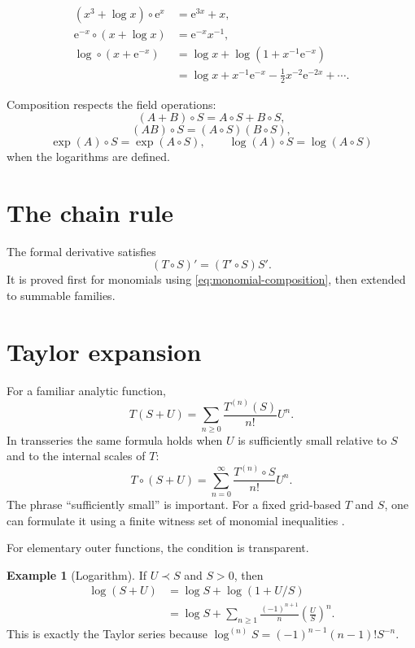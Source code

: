 \documentclass[11pt,oneside]{book}
\theoremstyle{definition}
\newtheorem{example}[theorem]{Example}
\theoremstyle{remark}
\newcommand{\e}{\mathrm{e}}
\newcommand{\precdom}{\prec}
\newcommand{\compose}{\mathbin{\circ}}
\begin{document}
\begin{align*}
  (x^3+\log x)\compose\e^x
  &=\e^{3x}+x,\\
  \e^{-x}\compose(x+\log x)
  &=\e^{-x}x^{-1},\\
  \log\compose(x+\e^{-x})
  &=\log x+\log(1+x^{-1}\e^{-x})\\
  &=\log x+x^{-1}\e^{-x}
    -\frac12x^{-2}\e^{-2x}+\cdots.
\end{align*}

Composition respects the field operations:
\[
  (A+B)\compose S=A\compose S+B\compose S,
\]
\[
  (AB)\compose S=(A\compose S)(B\compose S),
\]
\[
  \exp(A)\compose S=\exp(A\compose S),
  \qquad
  \log(A)\compose S=\log(A\compose S)
\]
when the logarithms are defined.

\section{The chain rule}

The formal derivative satisfies
\begin{equation}
  (T\compose S)'=(T'\compose S)S'.
  \label{eq:chain-rule}
\end{equation}
It is proved first for monomials using
\eqref{eq:monomial-composition}, then extended to summable families.

\section{Taylor expansion}

For a familiar analytic function,
\[
  T(S+U)=\sum_{n\ge0}\frac{T^{(n)}(S)}{n!}U^n.
\]
In transseries the same formula holds when $U$ is sufficiently small relative to
$S$ and to the internal scales of $T$:
\begin{equation}
  T\compose(S+U)
  =\sum_{n=0}^{\infty}
    \frac{T^{(n)}\compose S}{n!}U^n.
  \label{eq:transseries-taylor}
\end{equation}
The phrase ``sufficiently small'' is important. For a fixed grid-based $T$ and
$S$, one can formulate it using a finite witness set of monomial inequalities
\cite{EdgarComposition}.

For elementary outer functions, the condition is transparent.

\begin{example}[Logarithm]
If $U\precdom S$ and $S>0$, then
\begin{align*}
  \log(S+U)
  &=\log S+\log(1+U/S)\\
  &=\log S+\sum_{n\ge1}\frac{(-1)^{n+1}}{n}
      \left(\frac{U}{S}\right)^n.
\end{align*}
This is exactly the Taylor series because
$\log^{(n)}S=(-1)^{n-1}(n-1)!S^{-n}$.
\end{example}
\end{document}
